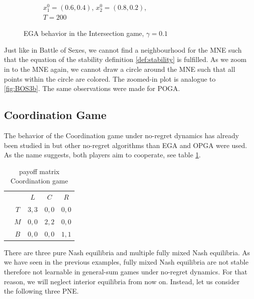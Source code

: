 \begin{figure}[H]
\begin{subfigure}{.5\textwidth}
    \caption{$x_{1}^0 = (0.6,0.4)$, $x_{2}^0 = (0.8,0.2)$, \\ $T = 200$}
    \label{fig:IntersectionGame1b}
\end{subfigure}
\caption{EGA behavior in the Intersection game, $\gamma = 0.1$}
\label{fig:IntersectionGame1}
\end{figure}


Just like in Battle of Sexes, we cannot find a neighbourhood for the MNE such that the equation of the stability definition \ref{def:stability} is fulfilled. As we zoom in to the MNE again, we cannot draw a circle around the MNE such that all points within the circle are colored. The zoomed-in plot is analogue to \ref{fig:BOS3b}. The same observations were made for POGA. 


\subsection{Coordination Game}\label{subsection:coordinationGame}

The behavior of the Coordination game under no-regret dynamics has already been studied in \cite{jafari} but other no-regret algorithms than EGA and OPGA were used. As the name suggests, both players aim to cooperate, see table \ref{tab:payoffCoordination3x3}. 

\begin{table}[H]\centering
\setlength{\extrarowheight}{2pt}
\begin{tabular}{cc|c|c|c|}
  & \multicolumn{1}{c}{} & \multicolumn{1}{c}{$L$}  & \multicolumn{1}{c}{$C$}  & \multicolumn{1}{c}{$R$} \\\cline{3-5}
            & $T$ & $3,3$ & $0,0$ & $0,0$ \\ \cline{3-5}
            & $M$ & $0,0$ & $2,2$ & $0,0$ \\\cline{3-5}
            & $B$ & $0,0$ & $0,0$ & $1,1$ \\\cline{3-5}
\end{tabular}\caption{\label{tab:payoffCoordination3x3}payoff matrix Coordination game}
\end{table}

There are three pure Nash equilibria and multiple fully mixed Nash equilibria. As we have seen in the previous examples, fully mixed Nash equilibria are not stable therefore not learnable in general-sum games under no-regret dynamics. For that reason, we will neglect interior equilibria from now on. Instead, let us consider the following three PNE.

